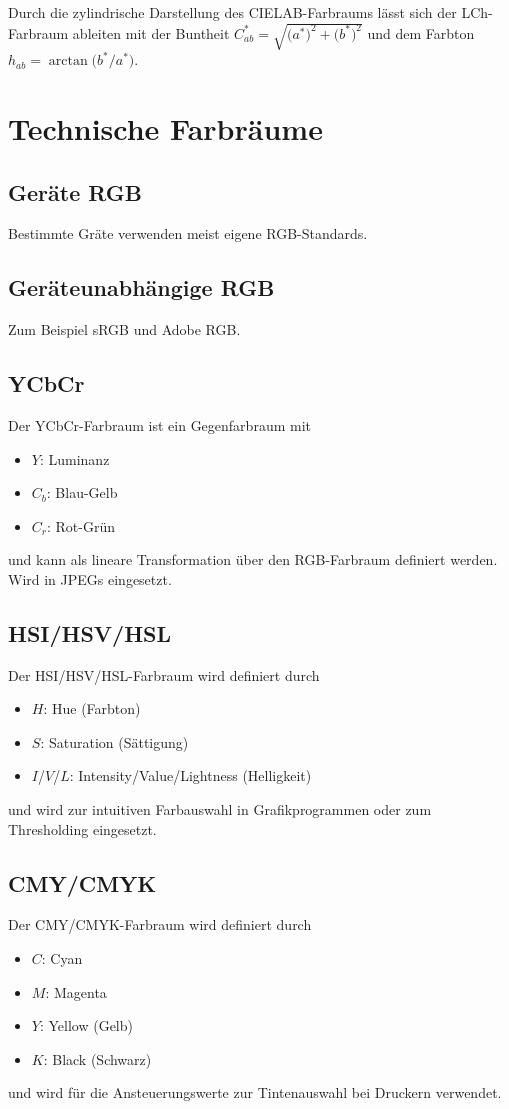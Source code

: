 			Durch die zylindrische Darstellung des CIELAB-Farbraums lässt sich der LCh-Farbraum ableiten mit der Buntheit \( C_{ab}^\ast = \sqrt{\big(a^\ast\big)^2 + \big(b^\ast\big)^2} \) und dem Farbton \( h_{ab} = \arctan\big( b^\ast / a^\ast \big) \).

		\section{Technische Farbräume}
			\subsection{Geräte RGB}
				Bestimmte Gräte verwenden meist eigene RGB-Standards.

			\subsection{Geräteunabhängige RGB}
				Zum Beispiel sRGB und Adobe RGB.

			\subsection{YCbCr}
				Der YCbCr-Farbraum ist ein Gegenfarbraum mit
				\begin{itemize}
					\item \(Y\): Luminanz
					\item \(C_b\): Blau-Gelb
					\item \(C_r\): Rot-Grün
				\end{itemize}
				und kann als lineare Transformation über den RGB-Farbraum definiert werden. Wird \bspw in JPEGs eingesetzt.

			\subsection{HSI/HSV/HSL}
				Der HSI/HSV/HSL-Farbraum wird definiert durch
				\begin{itemize}
					\item \(H\): Hue (Farbton)
					\item \(S\): Saturation (Sättigung)
					\item \(I\)/\(V\)/\(L\): Intensity/Value/Lightness (Helligkeit)
				\end{itemize}
				und wird \bspw zur intuitiven Farbauswahl in Grafikprogrammen oder zum Thresholding eingesetzt.

			\subsection{CMY/CMYK}
				Der CMY/CMYK-Farbraum wird definiert durch
				\begin{itemize}
					\item \(C\): Cyan
					\item \(M\): Magenta
					\item \(Y\): Yellow (Gelb)
					\item \(K\): Black (Schwarz)
				\end{itemize}
				und wird \bspw für die Ansteuerungswerte zur Tintenauswahl bei Druckern verwendet.

